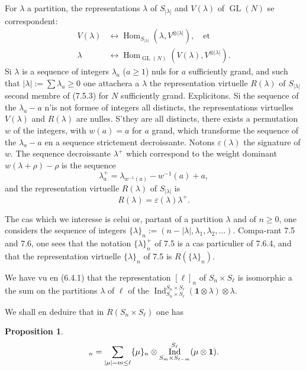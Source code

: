 \documentclass[11pt,a4paper]{article}
\theoremstyle{plain}
\newtheorem{proposition}[theorem]{Proposition}
\theoremstyle{definition}
\DeclareMathOperator{\Hom}{Hom}
\DeclareMathOperator{\Ind}{Ind}
\DeclareMathOperator{\GL}{GL}
\newcommand{\eps}{\varepsilon}
\begin{document}
For $\lambda$ a partition, the representations $\lambda$ of $S_{|\lambda|}$ and $V(\lambda)$ of $\GL(N)$ se correspondent:
\begin{align}
V(\lambda) &\leftrightarrow \Hom_{S_{|\lambda|}}(\lambda, V^{\otimes |\lambda|}), \quad \text{et} \tag{7.6.1} \\
\lambda &\leftrightarrow \Hom_{\GL(N)}(V(\lambda), V^{\otimes |\lambda|}). \tag{7.6.3}
\end{align}
Si $\lambda$ is a sequence of integers $\lambda_a$ ($a \geq 1$) nuls for $a$ sufficiently grand, and such that $|\lambda| := \sum \lambda_a \geq 0$ one attachera a $\lambda$ the representation virtuelle $R(\lambda)$ of $S_{|\lambda|}$ second membre of (7.5.3) for $N$ sufficiently grand. Explicitons. Si the sequence of the $\lambda_a - a$ n'is not formee of integers all distincts, the representations virtuelles $V(\lambda)$ and $R(\lambda)$ are nulles. S'they are all distincts, there exists a permutation $w$ of the integers, with $w(a) = a$ for $a$ grand, which transforme the sequence of the $\lambda_a - a$ en a sequence strictement decroissante. Notons $\eps(\lambda)$ the signature of $w$. The sequence decroissante $\lambda^+$ which correspond to the weight dominant $w(\lambda + \rho) - \rho$ is the sequence
\begin{equation}
\lambda^+_a = \lambda_{w^{-1}(a)} - w^{-1}(a) + a, \tag{7.6.4}
\end{equation}
and the representation virtuelle $R(\lambda)$ of $S_{|\lambda|}$ is
\begin{equation}
R(\lambda) = \eps(\lambda) \lambda^+. \tag{7.6.5}
\end{equation}

The cas which we interesse is celui or, partant of a partition $\lambda$ and of $n \geq 0$, one considers the sequence of integers $\{\lambda\}_n := (n - |\lambda|, \lambda_1, \lambda_2, \ldots)$. Compa-rant 7.5 and 7.6, one sees that the notation $\{\lambda\}^+_n$ of 7.5 is a cas particulier of 7.6.4, and that the representation virtuelle $\{\lambda\}_n$ of 7.5 is $R(\{\lambda\}_n)$.

We have vu en (6.4.1) that the representation $[\ell]_n$ of $S_n \times S_\ell$ is isomorphic a the sum on the partitions $\lambda$ of $\ell$ of the $\Ind_{S_n \times S_\ell}^{S_n \times S_\ell}(\mathbf{1} \otimes \lambda) \otimes \lambda$.

We shall en deduire that in $R(S_n \times S_\ell)$ one has

\begin{proposition}
\begin{equation}
[\ell]_n = \sum_{|\mu| = m \leq \ell} \{\mu\}_n \otimes \Ind_{S_m \times S_{\ell-m}}^{S_\ell}(\mu \otimes \mathbf{1}). \notag
\end{equation}
\end{proposition}
\end{document}
